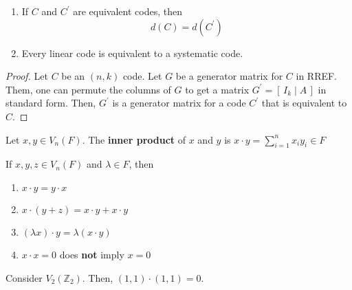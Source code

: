 \begin{thmbox}
    \begin{theorem}
        \begin{enumerate}[(1)]
            \item If $ C $ and $ C^{\prime} $ are equivalent codes, then
                  \[ d(C)=d(C^{\prime}) \]
            \item Every linear code is equivalent to a systematic code.
        \end{enumerate}
    \end{theorem} \end{thmbox}

\begin{proof}
    Let $ C $ be an $ (n,k) $ code. Let $ G $ be a generator matrix for $ C $
    in RREF. Them, one can permute the columns of $ G $ to get a matrix
    $ G^{\prime}=\left[ \,I_k\mid A\, \right] $ in standard form. Then,
    $ G^{\prime} $ is a generator matrix for a code $ C^{\prime} $ that is
    equivalent to $ C $.
\end{proof}

\begin{defbox}
    \begin{definition}
        Let $ x,y\in V_n(F) $. The \textbf{inner product} of $ x $ and $ y $
        is $ x\cdot y=\sum\limits_{i=1}^{n} x_iy_i\in F $
    \end{definition} \end{defbox}

\begin{thmbox}
    \begin{theorem}
        If $ x,y,z\in V_n(F) $ and $ \lambda\in F $, then
        \begin{enumerate}[(1)]
            \item $ x\cdot y=y\cdot x $
            \item $ x\cdot (y+z)=x\cdot y+x\cdot y $
            \item $ (\lambda x)\cdot y=\lambda(x\cdot y) $
            \item $ x\cdot x=0$ does \textbf{not} imply $ x=0 $
        \end{enumerate}
    \end{theorem} \end{thmbox}

\begin{exbox}
    \begin{example}
    Consider $ V_2(\mathbb{Z}_2) $. Then, $ (1,1)\cdot(1,1)=0 $.
\end{example}
\end{exbox}

